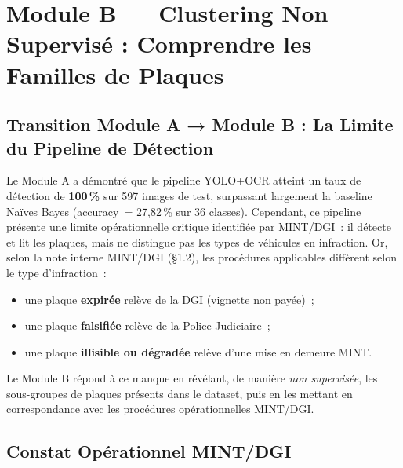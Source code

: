 
\section{Module B — Clustering Non Supervisé : Comprendre les Familles
de Plaques}
\label{sec:module_b}

\subsection{Transition Module A → Module B : La Limite du Pipeline de
Détection}
\label{sec:b:transition_a}

Le Module A a démontré que le pipeline YOLO+OCR atteint un taux de
détection de \textbf{100\,\%} sur 597 images de test, surpassant
largement la baseline Naïves Bayes (accuracy~= 27{,}82\,\% sur 36
classes). Cependant, ce pipeline présente une limite opérationnelle
critique identifiée par MINT/DGI~: il détecte et lit les plaques, mais
ne distingue pas les types de véhicules en infraction. Or, selon la
note interne MINT/DGI (§1.2), les procédures applicables diffèrent
selon le type d'infraction~:

\begin{itemize}
  \item une plaque \textbf{expirée} relève de la DGI (vignette non
    payée)~;
  \item une plaque \textbf{falsifiée} relève de la Police Judiciaire~;
  \item une plaque \textbf{illisible ou dégradée} relève d'une mise en
    demeure MINT.
\end{itemize}

Le Module B répond à ce manque en révélant, de manière
\textit{non supervisée}, les sous-groupes de plaques présents dans le
dataset, puis en les mettant en correspondance avec les procédures
opérationnelles MINT/DGI.

\subsection{Constat Opérationnel MINT/DGI}
\label{sec:b:constat}

